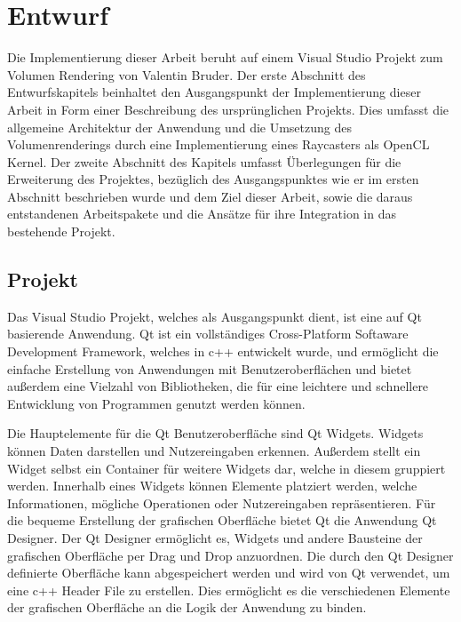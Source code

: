 \chapter{Entwurf}\label{chap::design}
Die Implementierung dieser Arbeit beruht auf einem Visual Studio Projekt zum Volumen Rendering von Valentin Bruder.
Der erste Abschnitt des Entwurfskapitels beinhaltet den Ausgangspunkt der Implementierung dieser Arbeit in Form einer Beschreibung des ursprünglichen Projekts.
Dies umfasst die allgemeine Architektur der Anwendung und die Umsetzung des Volumenrenderings durch eine Implementierung eines Raycasters als OpenCL Kernel.
Der zweite Abschnitt des Kapitels umfasst Überlegungen für die Erweiterung des Projektes, bezüglich des Ausgangspunktes wie er im ersten Abschnitt beschrieben wurde und dem Ziel dieser Arbeit, sowie die daraus entstandenen Arbeitspakete und die Ansätze für ihre Integration in das bestehende Projekt.

\section{Projekt}\label{sec::proj}
Das Visual Studio Projekt, welches als Ausgangspunkt dient, ist eine auf Qt basierende Anwendung.
Qt ist ein vollständiges Cross-Platform Softaware Development Framework, welches in c++ entwickelt wurde, und ermöglicht die einfache Erstellung von Anwendungen mit Benutzeroberflächen und bietet außerdem eine Vielzahl von Bibliotheken, die für eine leichtere und schnellere Entwicklung von Programmen genutzt werden können.

Die Hauptelemente für die Qt Benutzeroberfläche sind Qt Widgets.
Widgets können Daten darstellen und Nutzereingaben erkennen.
Außerdem stellt ein Widget selbst ein Container für weitere Widgets dar, welche in diesem gruppiert werden.
Innerhalb eines Widgets können Elemente platziert werden, welche Informationen, mögliche Operationen oder Nutzereingaben repräsentieren.
Für die bequeme Erstellung der grafischen Oberfläche bietet Qt die Anwendung Qt Designer.
Der Qt Designer ermöglicht es, Widgets und andere Bausteine der grafischen Oberfläche per Drag und Drop anzuordnen.
Die durch den Qt Designer definierte Oberfläche kann abgespeichert werden und wird von Qt verwendet, um eine c++ Header File zu erstellen.
Dies ermöglicht es die verschiedenen Elemente der grafischen Oberfläche an die Logik der Anwendung zu binden. \cite{Qt}

